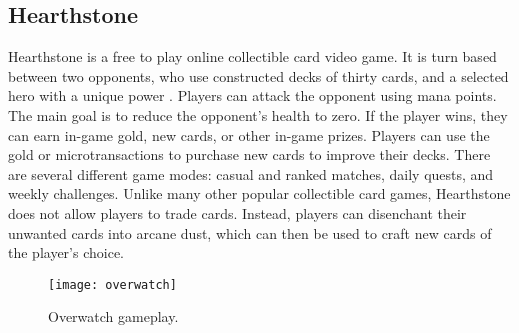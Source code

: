\subsection{Hearthstone}
Hearthstone is a free to play online collectible card video game. It is turn based between two opponents, who use constructed decks of thirty cards, and a selected hero with a unique power  \cite{Hearthstone}. Players can attack the opponent using mana points. The main goal is to reduce the opponent's health to zero. If the player wins, they can earn in-game gold, new cards, or other in-game prizes. Players can use the gold or microtransactions to purchase new cards to improve their decks. There are several different game modes: casual and ranked matches, daily quests, and weekly challenges. Unlike many other popular collectible card games, Hearthstone does not allow players to trade cards. Instead, players can disenchant their unwanted cards into arcane dust, which can then be used to craft new cards of the player's choice. 

\begin{figure}[h]
\centering
\texttt{[image: overwatch]}
\caption{Overwatch gameplay.}
\end{figure}
